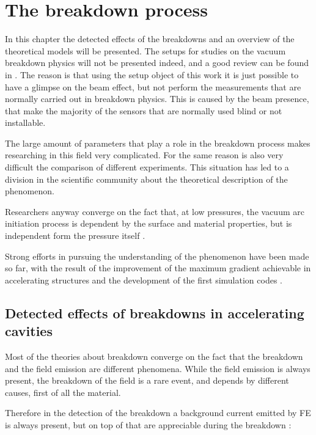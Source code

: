 \chapter[The breakdown process]{The breakdown process}

In this chapter the detected effects of the breakdowns and an overview of the theoretical models will be presented. The setups for studies on the vacuum breakdown physics will not be presented indeed, and a good review can be found in \cite{Kovermann:1330346}. The reason is that using the setup object of this work it is just possible to have a glimpse on the beam effect, but not perform the measurements that are normally carried out in breakdown physics. This is caused by the beam presence, that make the majority of the sensors that are normally used blind or not installable.

The large amount of parameters that play a role in the breakdown process makes researching in this field very complicated. For the same reason is also very difficult the comparison of different experiments. This situation has led to a division in the scientific community about the theoretical description of the phenomenon.

Researchers anyway converge on the fact that, at low pressures, the vacuum arc initiation process is dependent by the surface and material properties, but is independent form the pressure itself \cite{alpert:triggers}.

Strong efforts in pursuing the understanding of the phenomenon have been made so far, with the result of the improvement of the maximum gradient achievable in accelerating structures and the development of the first simulation codes \cite{Insepov:1373092}.



\section[Detected effects of breakdowns in accelerating cavities]{Detected effects of breakdowns in accelerating cavities}

Most of the theories about breakdown converge on the fact that the breakdown and the field emission are different phenomena. While the field emission is always present, the breakdown of the field is a rare event, and depends by different causes, first of all the material.

Therefore in the detection of the breakdown a background current emitted by FE is always present, but on top of that are appreciable during the breakdown \cite{Wuensch:583549}:

